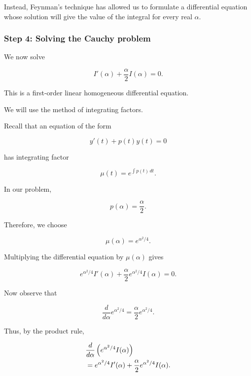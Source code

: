 \documentclass[11pt,a4paper]{article}
\theoremstyle{definition}
\theoremstyle{remark}
\begin{document}
Instead, Feynman's technique
has allowed us to formulate
a differential equation
whose solution will give
the value of the integral
for every real $\alpha$.

\subsubsection*{Step 4: Solving
the Cauchy problem}

We now solve

\begin{equation}
    I'(\alpha)
    +
    \frac{\alpha}{2}I(\alpha)=0.
\end{equation}

This is a first-order linear
homogeneous differential
equation.

We will use the method
of integrating factors.

Recall that an equation
of the form

\[
    y'(t)+p(t)y(t)=0
\]

has integrating factor

\[
    \mu(t)
    =
    e^{\int p(t)\,dt}.
\]

In our problem,

\[
    p(\alpha)=\frac{\alpha}{2}.
\]

Therefore, we choose

\begin{equation}
    \mu(\alpha)
    =
    e^{\alpha^2/4}.
    \label{eq:cauchy_integrating_factor}
\end{equation}

Multiplying the
differential equation
by $\mu(\alpha)$ gives

\begin{equation}
    e^{\alpha^2/4}I'(\alpha)
    +
    \frac{\alpha}{2}
    e^{\alpha^2/4}I(\alpha)
    =
    0.
\end{equation}

Now observe that

\[
    \frac{d}{d\alpha}
    e^{\alpha^2/4}
    =
    \frac{\alpha}{2}
    e^{\alpha^2/4}.
\]

Thus, by the product rule,

\begin{align}
    &\frac{d}{d\alpha}
    \left(
    e^{\alpha^2/4}I(\alpha)
    \right)
    \notag\\
    &=
    e^{\alpha^2/4}I'(\alpha)
    +
    \frac{\alpha}{2}
    e^{\alpha^2/4}I(\alpha).
\end{align}
\end{document}
